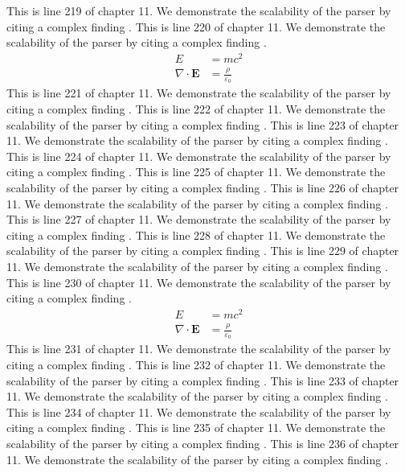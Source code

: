 This is line 219 of chapter 11. We demonstrate the scalability of the parser by citing a complex finding \cite{ref11_219}.
This is line 220 of chapter 11. We demonstrate the scalability of the parser by citing a complex finding \cite{ref11_220}.
\begin{align*}
  E &= mc^2 \\
  \nabla \cdot \mathbf{E} &= \frac{\rho}{\varepsilon_0}
\end{align*}
This is line 221 of chapter 11. We demonstrate the scalability of the parser by citing a complex finding \cite{ref11_221}.
This is line 222 of chapter 11. We demonstrate the scalability of the parser by citing a complex finding \cite{ref11_222}.
This is line 223 of chapter 11. We demonstrate the scalability of the parser by citing a complex finding \cite{ref11_223}.
This is line 224 of chapter 11. We demonstrate the scalability of the parser by citing a complex finding \cite{ref11_224}.
This is line 225 of chapter 11. We demonstrate the scalability of the parser by citing a complex finding \cite{ref11_225}.
This is line 226 of chapter 11. We demonstrate the scalability of the parser by citing a complex finding \cite{ref11_226}.
This is line 227 of chapter 11. We demonstrate the scalability of the parser by citing a complex finding \cite{ref11_227}.
This is line 228 of chapter 11. We demonstrate the scalability of the parser by citing a complex finding \cite{ref11_228}.
This is line 229 of chapter 11. We demonstrate the scalability of the parser by citing a complex finding \cite{ref11_229}.
This is line 230 of chapter 11. We demonstrate the scalability of the parser by citing a complex finding \cite{ref11_230}.
\begin{align*}
  E &= mc^2 \\
  \nabla \cdot \mathbf{E} &= \frac{\rho}{\varepsilon_0}
\end{align*}
This is line 231 of chapter 11. We demonstrate the scalability of the parser by citing a complex finding \cite{ref11_231}.
This is line 232 of chapter 11. We demonstrate the scalability of the parser by citing a complex finding \cite{ref11_232}.
This is line 233 of chapter 11. We demonstrate the scalability of the parser by citing a complex finding \cite{ref11_233}.
This is line 234 of chapter 11. We demonstrate the scalability of the parser by citing a complex finding \cite{ref11_234}.
This is line 235 of chapter 11. We demonstrate the scalability of the parser by citing a complex finding \cite{ref11_235}.
This is line 236 of chapter 11. We demonstrate the scalability of the parser by citing a complex finding \cite{ref11_236}.
